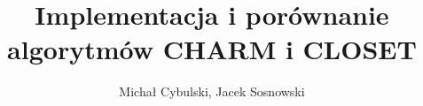\documentclass[12pt,oneside,a4paper]{article}
\begin{document}
\author{Michał Cybulski, Jacek Sosnowski}
\title{Implementacja i porównanie algorytmów CHARM i CLOSET}
\maketitle
%
\clearpage
\tableofcontents
\clearpage
{}









\clearpage

\end{document}
